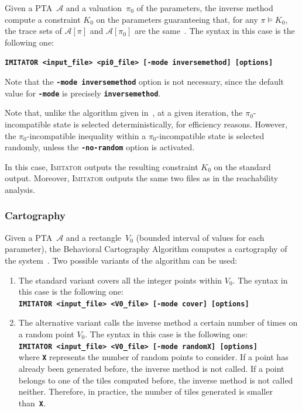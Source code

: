 \documentclass[a4paper,10pt]{article}
\newcommand{\A}{\mathcal{A}}
\newcommand{\imitator}{\textsc{Imitator}}
\newcommand{\imitatorExec}{\code{IMITATOR}}
\newcommand{\code}[1]{\textbf{\texttt{#1}}}
\begin{document}
Given a PTA~$\A$ and a valuation~$\pi_0$ of the parameters, the inverse method compute a constraint $K_0$ on the parameters guaranteeing that, for any $\pi \models K_0$, the trace sets of $\A[\pi]$ and $\A[\pi_0]$ are the same~\cite{acef09}.
The syntax in this case is the following one:

\code{\imitatorExec{} <input\_file> <pi0\_file> [-mode inversemethod] [options]}

Note that the \code{-mode inversemethod} option is not necessary, since the default value for \code{-mode} is precisely \code{inversemethod}.

Note that, unlike the algorithm given in~\cite{acef09}, at a given iteration, the $\pi_0$-incompatible state is selected deterministically, for efficiency reasons.
However, the $\pi_0$-incompatible inequality within a $\pi_0$-incompatible state is selected randomly, unless the \code{-no-random} option is activated.

In this case, \imitator{} outputs the resulting constraint $K_0$ on the standard output.
Moreover, \imitator{} outputs the same two files as in the reachability analysis.


\subsubsection{Cartography} \label{ss:mode_cartography}

Given a PTA~$\A$ and a rectangle~$V_0$ (bounded interval of values for each parameter), the Behavioral Cartography Algorithm computes a cartography of the system~\cite{af10}.
Two possible variants of the algorithm can be used:
\begin{enumerate}
	\item The standard variant covers all the integer points within $V_0$.
	The syntax in this case is the following one:\\
	\code{\imitatorExec{} <input\_file> <V0\_file> [-mode cover] [options]}

	\item The alternative variant calls the inverse method a certain number of times on a random point $V_0$.
	The syntax in this case is the following one:\\
	\code{\imitatorExec{} <input\_file> <V0\_file> [-mode randomX] [options]}\\
	where \code{X} represents the number of random points to consider.
	If a point has already been generated before, the inverse method is not called.
	If a point belongs to one of the tiles computed before, the inverse method is not called neither.
	Therefore, in practice, the number of tiles generated is smaller than~\code{X}.
\end{enumerate}
\end{document}
